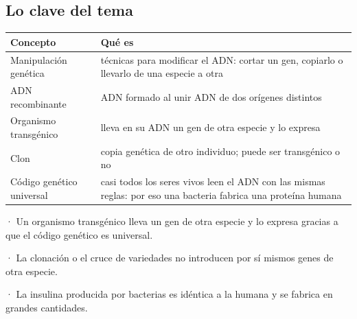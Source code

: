 \subsection{Lo clave del tema}
\begin{center}\small
\begin{tabularx}{\linewidth}{@{}>{\raggedright\arraybackslash\hsize=0.77\hsize}X>{\raggedright\arraybackslash\hsize=1.23\hsize}X@{}}
\toprule
\textbf{Concepto} & \textbf{Qué es} \\
\midrule
Manipulación genética & técnicas para modificar el ADN: cortar un gen, copiarlo o llevarlo de una especie a otra \\
ADN recombinante & ADN formado al unir ADN de dos orígenes distintos \\
Organismo transgénico & lleva en su ADN un gen de otra especie y lo expresa \\
Clon & copia genética de otro individuo; puede ser transgénico o no \\
Código genético universal & casi todos los seres vivos leen el ADN con las mismas reglas: por eso una bacteria fabrica una proteína humana \\
\bottomrule
\end{tabularx}
\end{center}
 
\begin{clave}[{Recuerda}] · Un organismo transgénico lleva un gen de otra especie y lo expresa gracias a que el código genético es universal.\par · La clonación o el cruce de variedades no introducen por sí mismos genes de otra especie.\par · La insulina producida por bacterias es idéntica a la humana y se fabrica en grandes cantidades.\end{clave}
 
